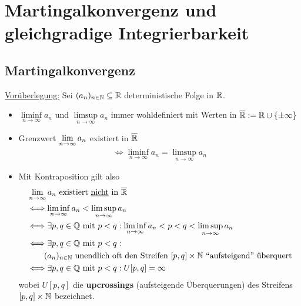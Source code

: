
\chapter{Martingalkonvergenz und gleichgradige Integrierbarkeit} %

\section{Martingalkonvergenz} %
\setcounter{section}{4} %
\underline{Vorüberlegung:} Sei $(a_n)_{n\in\mathbb{N}}\subseteq\mathbb{R}$ deterministische Folge in $\mathbb{R}$.
\begin{itemize}
	\item $\liminf\limits_{n\to\infty} a_n$ und $\limsup\limits_{n\to\infty} a_n$ immer wohldefiniert mit Werten in $\overline{\mathbb{R}}:=\mathbb{R}\cup\lbrace\pm\infty\rbrace$
	\item Grenzwert $\lim\limits_{n\to\infty} a_n$ existiert in $\overline{\mathbb{R}}$
	\begin{align*}
		\Longleftrightarrow\liminf\limits_{n\to\infty} a_n=\limsup\limits_{n\to\infty} a_n
	\end{align*}
	\item Mit Kontraposition gilt also 
	\begin{align*}
		&\lim\limits_{n\to\infty} a_n\text{ existiert \underline{nicht} in }\overline{\mathbb{R}}\\
		&\Longleftrightarrow\liminf\limits_{n\to\infty} a_n<\limsup\limits_{n\to\infty} a_n\\
		&\Longleftrightarrow
		\exists p,q\in\mathbb{Q}\text{ mit } p<q:\liminf\limits_{n\to\infty} a_n<p<q<\limsup\limits_{n\to\infty} a_n\\
		&\Longleftrightarrow
		\exists p,q\in\mathbb{Q}\text{ mit } p<q:\\
		&\qquad(a_n)_{n\in\mathbb{N}}\text{ unendlich oft den Streifen }[p,q]\times\mathbb{N}\text{ ``aufsteigend'' überquert}\\
		&\Longleftrightarrow
		\exists p,q\in\mathbb{Q}\text{ mit } p<q:U[p,q]=\infty
	\end{align*}
	wobei $U[p,q]$ die \textbf{upcrossings} (aufsteigende Überquerungen) des Streifens $[p,q]\times\mathbb{N}$ bezeichnet.
\end{itemize}

